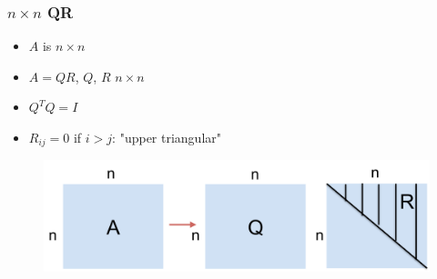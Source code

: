 \documentclass{beamer}
\begin{document}
\begin{frame}
\frametitle{$n \times n$ QR}

\begin{itemize}
\item $A$ is $n \times n$
\item $A = QR$, $Q$, $R$ $n \times n$
\item $Q^TQ = I$
\item $R_{ij} = 0$ if $i > j$: "upper triangular"
\end{itemize}

\begin{figure}
\includegraphics[scale=0.4]{figs/qr.pdf}
\end{figure}

\end{frame}
\end{document}
